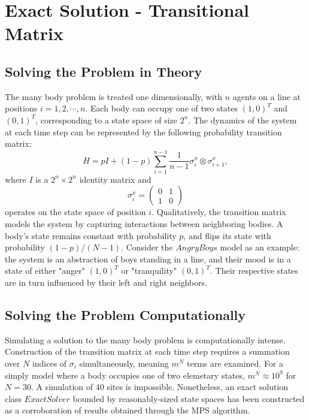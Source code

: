 \documentclass[english]{article}
\begin{document}
\section{Exact Solution - Transitional Matrix}

\subsection{Solving the Problem in Theory}
	The many body problem is treated one dimensionally, with $n$ agents on a line at positions $i=1,2,\cdots,n$. Each body can occupy one of two states $(1,0)^T$ and $(0,1)^T$, corresponding to a state space of size $2^n$. The dynamics of the system at each time step can be represented by the following probability transition matrix:
\begin{displaymath}
H = pI + (1-p)\sum_{i=1}^{n-1}\frac{1}{n-1}\sigma_i^x\otimes\sigma_{i+1}^x,
\end{displaymath}
where $I$ is a $2^n\times2^n$ identity matrix and
\begin{displaymath}
\sigma_i^x =
\begin{pmatrix}
0 & 1 \\
1 & 0
\end{pmatrix}
\end{displaymath}
operates on the state space of position $i$.  Qualitatively, the transition matrix models the system by capturing interactions between neighboring bodies. A body's state remains constant with probability $p$, and flips its state with probability  $(1-p)/(N-1)$. Consider the $Angry Boys$ model as an example: the system is an abstraction of boys standing in a line, and their mood is in a state of either  "anger" $(1,0)^T$ or "tranquility" $(0,1)^T$. Their respective states are in turn influenced by their left and right neighbors.

\subsection{Solving the Problem Computationally}
	Simulating a solution to the many body problem is computationally intense. Construction of the transition matrix at each time step requires a summation over $N$ indices of $\sigma_{i}$
simultaneously, meaning $m^{N}$ terms are examined. For a simply model where a body occupies one of two elemetary states, $m^{N}\approx10^{9}$ for $N=30$. A simulation of $40$ sites is impossible.  Nonetheless, an exact solution class $ExactSolver$ bounded by reasonably-sized state spaces has been constructed as a corroboration of results obtained through the MPS algorithm.
\end{document}
